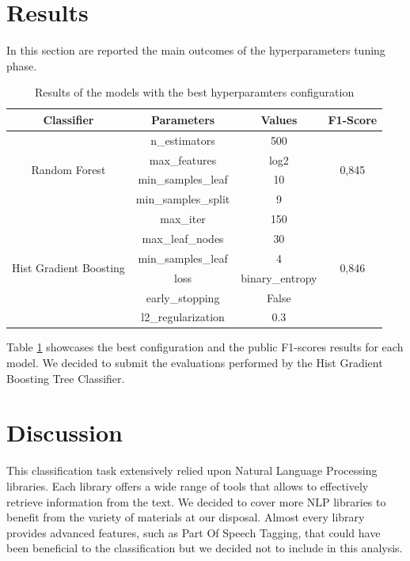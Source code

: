 \documentclass[conference]{IEEEtran}
\begin{document}
\section{Results}\label{sec:results}
In this section are reported the main outcomes of the hyperparameters tuning phase.
\begin{table}[h]
\begin{tabular}{@{}cccc@{}}
\toprule
\textbf{Classifier}                          & \textbf{Parameters} & \textbf{Values} & \textbf{F1-Score}      \\ \midrule
\multirow{4}{*}{Random Forest}               & n\_estimators       & 500             & \multirow{4}{*}{0,845} \\
                                             & max\_features       & log2            &                        \\
                                             & min\_samples\_leaf  & 10              &                        \\
                                             & min\_samples\_split & 9               &                        \\ \midrule
\multirow{6}{*}{Hist Gradient Boosting} & max\_iter           & 150             & \multirow{6}{*}{0,846} \\
                                             & max\_leaf\_nodes    & 30              &                        \\
                                             & min\_samples\_leaf  & 4               &                        \\
                                             & loss                & binary\_entropy &                        \\
                                             & early\_stopping     & False           &                        \\
                                             & l2\_regularization  & 0.3             &                        \\ \bottomrule
\end{tabular}
\caption{Results of the models with the best hyperparamters configuration}
\label{tab:results}
\end{table}
Table \ref{tab:results} showcases the best configuration and the public F1-scores results for each model.
We decided to submit the evaluations performed by the Hist Gradient Boosting Tree Classifier.
\section{Discussion}\label{sec:discussion}
This classification task extensively relied upon Natural Language Processing libraries. Each library offers a wide range of tools that allows to effectively retrieve information from the text. We decided to cover more NLP libraries to benefit from the variety of materials at our disposal. Almost every library provides advanced features, such as Part Of Speech Tagging, that could have been beneficial to the classification but we decided not to include in this analysis. 
\end{document}
